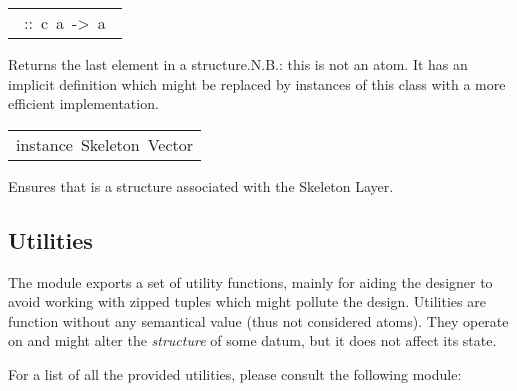 \begin{haddockdesc}
\begin{haddockdesc}
\item[\begin{tabular}{@{}l}\haddockid{last}\ ::\ c\ a\ ->\ a\ \end{tabular}]
\haddockbegindoc
Returns the last element in a structure.N.B.: this is not an atom. It has an implicit definition which might be replaced by instances of this class with a more efficient implementation.\par

\end{haddockdesc}


\item[\begin{tabular}{@{}l}
instance\ Skeleton\ Vector
\end{tabular}]\haddockbegindoc
Ensures that  is a structure associated with the Skeleton Layer.\par

\end{haddockdesc}

\subsection{Utilities}
The  module exports a set of utility functions,
 mainly for aiding the designer to avoid working with zipped
 tuples which might pollute the design. Utilities are function
 without any semantical value (thus not considered atoms). They
 operate on and might alter the \emph{structure} of some datum, but it
 does not affect its state.\par
For a list of all the provided utilities, please consult the
 following module:\par

